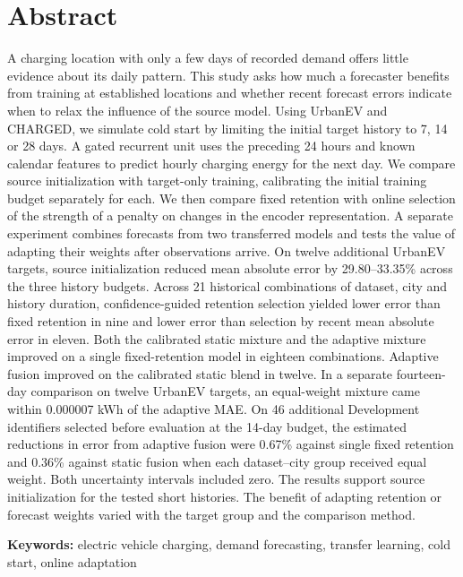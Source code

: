 \chapter*{Abstract}
A charging location with only a few days of recorded demand offers little evidence about its daily pattern. This study asks how much a forecaster benefits from training at established locations and whether recent forecast errors indicate when to relax the influence of the source model. Using UrbanEV and CHARGED, we simulate cold start by limiting the initial target history to 7, 14 or 28 days. A gated recurrent unit uses the preceding 24 hours and known calendar features to predict hourly charging energy for the next day. We compare source initialization with target-only training, calibrating the initial training budget separately for each. We then compare fixed retention with online selection of the strength of a penalty on changes in the encoder representation. A separate experiment combines forecasts from two transferred models and tests the value of adapting their weights after observations arrive. On twelve additional UrbanEV targets, source initialization reduced mean absolute error by 29.80--33.35\% across the three history budgets. Across 21 historical combinations of dataset, city and history duration, confidence-guided retention selection yielded lower error than fixed retention in nine and lower error than selection by recent mean absolute error in eleven. Both the calibrated static mixture and the adaptive mixture improved on a single fixed-retention model in eighteen combinations. Adaptive fusion improved on the calibrated static blend in twelve. In a separate fourteen-day comparison on twelve UrbanEV targets, an equal-weight mixture came within 0.000007 kWh of the adaptive MAE. On 46 additional Development identifiers selected before evaluation at the 14-day budget, the estimated reductions in error from adaptive fusion were 0.67\% against single fixed retention and 0.36\% against static fusion when each dataset--city group received equal weight. Both uncertainty intervals included zero. The results support source initialization for the tested short histories. The benefit of adapting retention or forecast weights varied with the target group and the comparison method.

\vspace{0.5cm}
\noindent\textbf{Keywords:} electric vehicle charging, demand forecasting, transfer learning, cold start, online adaptation
